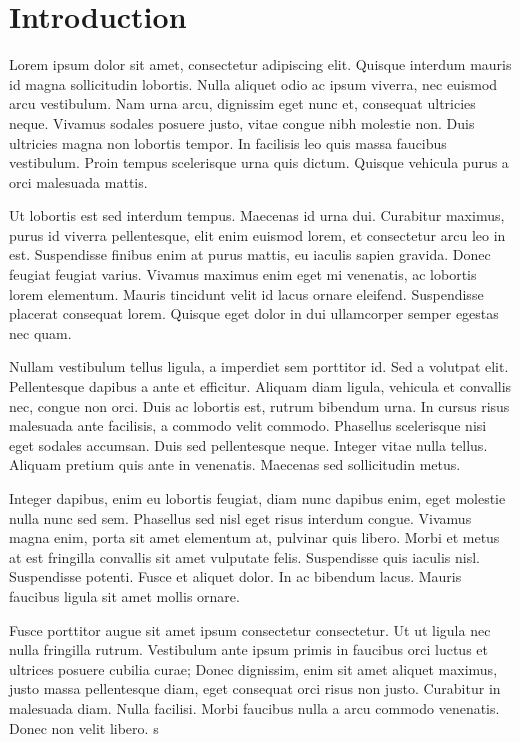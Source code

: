 \section{Introduction}



Lorem ipsum dolor sit amet, consectetur adipiscing elit. Quisque interdum mauris id magna sollicitudin lobortis. Nulla aliquet odio ac ipsum viverra, nec euismod arcu vestibulum. Nam urna arcu, dignissim eget nunc et, consequat ultricies neque. Vivamus sodales posuere justo, vitae congue nibh molestie non. Duis ultricies magna non lobortis tempor. In facilisis leo quis massa faucibus vestibulum. Proin tempus scelerisque urna quis dictum. Quisque vehicula purus a orci malesuada mattis.

Ut lobortis est sed interdum tempus. Maecenas id urna dui. Curabitur maximus, purus id viverra pellentesque, elit enim euismod lorem, et consectetur arcu leo in est. Suspendisse finibus enim at purus mattis, eu iaculis sapien gravida. Donec feugiat feugiat varius. Vivamus maximus enim eget mi venenatis, ac lobortis lorem elementum. Mauris tincidunt velit id lacus ornare eleifend. Suspendisse placerat consequat lorem. Quisque eget dolor in dui ullamcorper semper egestas nec quam.

Nullam vestibulum tellus ligula, a imperdiet sem porttitor id. Sed a volutpat elit. Pellentesque dapibus a ante et efficitur. Aliquam diam ligula, vehicula et convallis nec, congue non orci. Duis ac lobortis est, rutrum bibendum urna. In cursus risus malesuada ante facilisis, a commodo velit commodo. Phasellus scelerisque nisi eget sodales accumsan. Duis sed pellentesque neque. Integer vitae nulla tellus. Aliquam pretium quis ante in venenatis. Maecenas sed sollicitudin metus.

Integer dapibus, enim eu lobortis feugiat, diam nunc dapibus enim, eget molestie nulla nunc sed sem. Phasellus sed nisl eget risus interdum congue. Vivamus magna enim, porta sit amet elementum at, pulvinar quis libero. Morbi et metus at est fringilla convallis sit amet vulputate felis. Suspendisse quis iaculis nisl. Suspendisse potenti. Fusce et aliquet dolor. In ac bibendum lacus. Mauris faucibus ligula sit amet mollis ornare.

Fusce porttitor augue sit amet ipsum consectetur consectetur. Ut ut ligula nec nulla fringilla rutrum. Vestibulum ante ipsum primis in faucibus orci luctus et ultrices posuere cubilia curae; Donec dignissim, enim sit amet aliquet maximus, justo massa pellentesque diam, eget consequat orci risus non justo. Curabitur in malesuada diam. Nulla facilisi. Morbi faucibus nulla a arcu commodo venenatis. Donec non velit libero. s